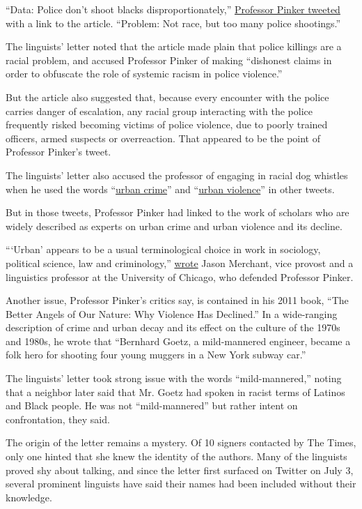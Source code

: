 ``Data: Police don't shoot blacks disproportionately,''
\href{https://twitter.com/sapinker/status/655389531429064704}{Professor
Pinker tweeted} with a link to the article. ``Problem: Not race, but too
many police shootings.''

The linguists' letter noted that the article made plain that police
killings are a racial problem, and accused Professor Pinker of making
``dishonest claims in order to obfuscate the role of systemic racism in
police violence.''

But the article also suggested that, because every encounter with the
police carries danger of escalation, any racial group interacting with
the police frequently risked becoming victims of police violence, due to
poorly trained officers, armed suspects or overreaction. That appeared
to be the point of Professor Pinker's tweet.

The linguists' letter also accused the professor of engaging in racial
dog whistles when he used the words
``\href{https://twitter.com/sapinker/status/1272150637237751813}{urban
crime}'' and
``\href{https://twitter.com/sapinker/status/1272145748050796544}{urban
violence}'' in other tweets.

But in those tweets, Professor Pinker had linked to the work of scholars
who are widely described as experts on urban crime and urban violence
and its decline.

```Urban' appears to be a usual terminological choice in work in
sociology, political science, law and criminology,''
\href{https://medium.com/@bhpartee/my-response-to-the-pinker-petition-open-letter-to-the-linguistics-community-80e2e4d9dbe2}{wrote}
Jason Merchant, vice provost and a linguistics professor at the
University of Chicago, who defended Professor Pinker.

Another issue, Professor Pinker's critics say, is contained in his 2011
book, ``The Better Angels of Our Nature: Why Violence Has Declined.'' In
a wide-ranging description of crime and urban decay and its effect on
the culture of the 1970s and 1980s, he wrote that ``Bernhard Goetz, a
mild-mannered engineer, became a folk hero for shooting four young
muggers in a New York subway car.''

The linguists' letter took strong issue with the words
``mild-mannered,'' noting that a neighbor later said that Mr. Goetz had
spoken in racist terms of Latinos and Black people. He was not
``mild-mannered'' but rather intent on confrontation, they said.

The origin of the letter remains a mystery. Of 10 signers contacted by
The Times, only one hinted that she knew the identity of the authors.
Many of the linguists proved shy about talking, and since the letter
first surfaced on Twitter on July 3, several prominent linguists have
said their names had been included without their knowledge.


